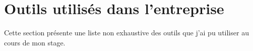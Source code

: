 \section{Outils utilisés dans l'entreprise}

Cette section présente une liste non exhaustive des outils que j'ai pu utiliser au cours de mon stage.
















